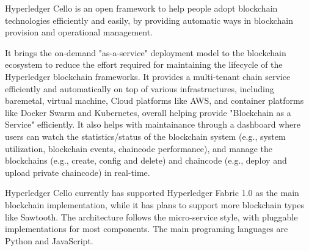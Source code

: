 Hyperledger Cello is an open framework to help people adopt blockchain technologies efficiently and easily, by providing automatic ways in blockchain provision and operational management. 

It brings the on-demand "as-a-service" deployment model to the blockchain ecosystem to reduce the effort required for maintaining the lifecycle of the Hyperledger blockchain frameworks. It provides a multi-tenant chain service efficiently and automatically on top of various infrastructures, including baremetal, virtual machine, Cloud platforms like AWS, and container platforms like Docker Swarm and Kubernetes, overall helping provide "Blockchain as a Service" efficiently. It also helps with maintainance through a dashboard where users can watch the statistics/status of the blockchain system (e.g., system utilization, blockchain events, chaincode performance), and manage the blockchains (e.g., create, config and delete) and chaincode (e.g., deploy and upload private chaincode) in real-time.

Hyperledger Cello currently has supported Hyperledger Fabric 1.0 as the main blockchain implementation, while it has plans to support more blockchain types like Sawtooth. The architecture follows the micro-service style, with pluggable implementations for most components. The main programing languages are Python and JavaScript.
